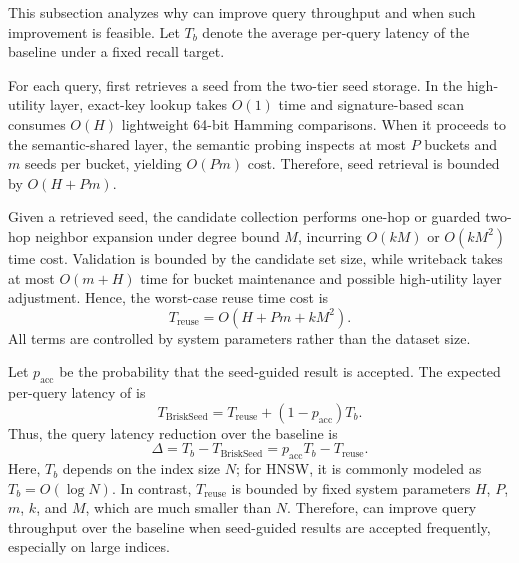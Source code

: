 This subsection analyzes why \system can improve query throughput and when such improvement is feasible. Let $T_b$ denote the average per-query latency of the baseline under a fixed recall target.

For each query, \system first retrieves a seed from the two-tier seed storage. In the high-utility layer, exact-key lookup takes $O(1)$ time and signature-based scan consumes $O(H)$ lightweight 64-bit Hamming comparisons. When it proceeds to the semantic-shared layer, the semantic probing inspects at most $P$ buckets and $m$ seeds per bucket, yielding $O(Pm)$ cost. Therefore, seed retrieval is bounded by $O(H+Pm)$.

Given a retrieved seed, the candidate collection performs one-hop or guarded two-hop neighbor expansion under degree bound $M$, incurring $O(kM)$ or $O(kM^2)$ time cost. Validation is bounded by the candidate set size, while writeback takes at most $O(m+H)$ time for bucket maintenance and possible high-utility layer adjustment. Hence, the worst-case reuse time cost is
\begin{equation}
T_{\text{reuse}} = O(H+Pm + kM^2).
\end{equation}
All terms are controlled by system parameters rather than the dataset size.


Let $p_{\text{acc}}$ be the probability that the seed-guided result is accepted.
The expected per-query latency of \system is
\begin{equation}
T_{\text{BriskSeed}} = T_{\text{reuse}} + (1-p_{\text{acc}})T_b.
\end{equation}
Thus, the query latency reduction over the baseline is
\begin{equation}
\Delta = T_b - T_{\text{BriskSeed}} = p_{\text{acc}}T_b - T_{\text{reuse}}.
\end{equation}
Here, $T_b$ depends on the index size $N$; for HNSW, it is commonly modeled as $T_b=O(\log N)$. In contrast, $T_{\text{reuse}}$ is bounded by fixed system parameters $H$, $P$, $m$, $k$, and $M$, which are much smaller than $N$. Therefore, \system can improve query throughput over the baseline when seed-guided results are accepted frequently, especially on large indices.





